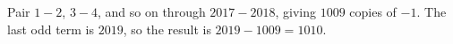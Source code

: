Pair $1-2$, $3-4$, and so on through $2017-2018$, giving $1009$ copies of $-1$. The last odd term is $2019$, so the result is $2019-1009=\boxed{1010}$.
